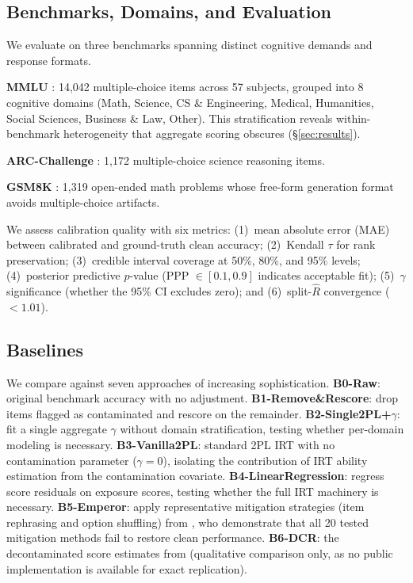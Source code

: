 \subsection{Benchmarks, Domains, and Evaluation}
\label{sec:benchmarks}

We evaluate on three benchmarks spanning distinct cognitive demands and response formats.

\textbf{MMLU} \citep{hendrycks2021mmlu}: 14,042 multiple-choice items across 57 subjects, grouped into 8 cognitive domains (Math, Science, CS \& Engineering, Medical, Humanities, Social Sciences, Business \& Law, Other). This stratification reveals within-benchmark heterogeneity that aggregate scoring obscures (\S\ref{sec:results}).

\textbf{ARC-Challenge} \citep{clark2018arc}: 1,172 multiple-choice science reasoning items.

\textbf{GSM8K} \citep{cobbe2021gsm8k}: 1,319 open-ended math problems whose free-form generation format avoids multiple-choice artifacts.

We assess calibration quality with six metrics: (1)~mean absolute error (MAE) between calibrated and ground-truth clean accuracy; (2)~Kendall $\tau$ for rank preservation; (3)~credible interval coverage at 50\%, 80\%, and 95\% levels; (4)~posterior predictive $p$-value (PPP $\in [0.1, 0.9]$ indicates acceptable fit); (5)~$\gamma$ significance (whether the 95\% CI excludes zero); and (6)~split-$\hat{R}$ convergence ($<1.01$).

\subsection{Baselines}
\label{sec:baselines}

We compare against seven approaches of increasing sophistication. \textbf{B0-Raw}: original benchmark accuracy with no adjustment. \textbf{B1-Remove\&Rescore}: drop items flagged as contaminated and rescore on the remainder. \textbf{B2-Single2PL+$\gamma$}: fit a single aggregate $\gamma$ without domain stratification, testing whether per-domain modeling is necessary. \textbf{B3-Vanilla2PL}: standard 2PL IRT with no contamination parameter ($\gamma=0$), isolating the contribution of IRT ability estimation from the contamination covariate. \textbf{B4-LinearRegression}: regress score residuals on exposure scores, testing whether the full IRT machinery is necessary. \textbf{B5-Emperor}: apply representative mitigation strategies (item rephrasing and option shuffling) from \citet{xu2025emperor}, who demonstrate that all 20 tested mitigation methods fail to restore clean performance. \textbf{B6-DCR}: the decontaminated score estimates from \citet{li2025dcr} (qualitative comparison only, as no public implementation is available for exact replication).